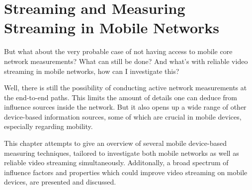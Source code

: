\chapter{Streaming and Measuring Streaming in Mobile Networks}
\label{chap:mobilestreaming}

But what about the very probable case of not having access to mobile core network measurements? What can still be done? And what's with reliable video streaming in mobile networks, how can I investigate this?

Well, there is still the possibility of conducting active network measurements at the end-to-end paths. This limits the amount of details one can deduce from influence sources inside the network. But it also opens up a wide range of other device-based information sources, some of which are crucial in mobile devices, especially regarding mobility.

This chapter attempts to give an overview of several mobile device-based measuring techniques, tailored to investigate both mobile networks as well as reliable video streaming simultaneously. Additonally, a broad spectrum of influence factors and properties which could improve video streaming on mobile devices, are presented and discussed.



